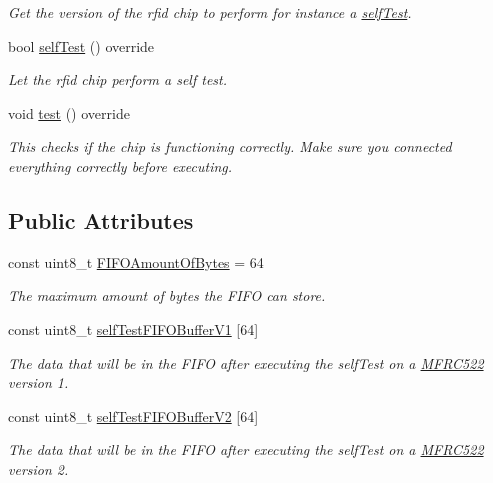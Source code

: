 \begin{DoxyCompactItemize}
\begin{DoxyCompactList}\small\item\em Get the version of the rfid chip to perform for instance a \mbox{\hyperlink{class_m_f_r_c522_adcc4f5eb212c1a94e462eab459bd685e}{self\+Test}}. \end{DoxyCompactList}\item 
bool \mbox{\hyperlink{class_m_f_r_c522_adcc4f5eb212c1a94e462eab459bd685e}{self\+Test}} () override
\begin{DoxyCompactList}\small\item\em Let the rfid chip perform a self test. \end{DoxyCompactList}\item 
void \mbox{\hyperlink{class_m_f_r_c522_aff8e84921e9f133cfbd243ce994da023}{test}} () override
\begin{DoxyCompactList}\small\item\em This checks if the chip is functioning correctly. Make sure you connected everything correctly before executing. \end{DoxyCompactList}\end{DoxyCompactItemize}
\subsection*{Public Attributes}
\begin{DoxyCompactItemize}
\item 
\mbox{\label{class_m_f_r_c522_a56c8309a003cf1a5d8479c7783826f8e}} 
const uint8\+\_\+t \mbox{\hyperlink{class_m_f_r_c522_a56c8309a003cf1a5d8479c7783826f8e}{F\+I\+F\+O\+Amount\+Of\+Bytes}} = 64
\begin{DoxyCompactList}\small\item\em The maximum amount of bytes the F\+I\+FO can store. \end{DoxyCompactList}\item 
const uint8\+\_\+t \mbox{\hyperlink{class_m_f_r_c522_a7d19c9869a7fbbe0d9825d5653d6af7b}{self\+Test\+F\+I\+F\+O\+Buffer\+V1}} \mbox{[}64\mbox{]}
\begin{DoxyCompactList}\small\item\em The data that will be in the F\+I\+FO after executing the self\+Test on a \mbox{\hyperlink{class_m_f_r_c522}{M\+F\+R\+C522}} version 1. \end{DoxyCompactList}\item 
const uint8\+\_\+t \mbox{\hyperlink{class_m_f_r_c522_a6973b73a8a922ac09b9d89489bdbc333}{self\+Test\+F\+I\+F\+O\+Buffer\+V2}} \mbox{[}64\mbox{]}
\begin{DoxyCompactList}\small\item\em The data that will be in the F\+I\+FO after executing the self\+Test on a \mbox{\hyperlink{class_m_f_r_c522}{M\+F\+R\+C522}} version 2. \end{DoxyCompactList}\end{DoxyCompactItemize}
